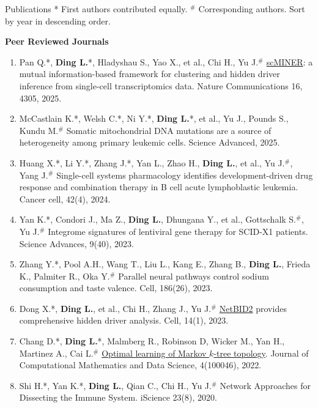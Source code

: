 \documentclass{resume} %
\begin{document}
\begin{rSection}{Publications}
* First authors contributed equally.  $^{\#}$ Corresponding authors. Sort by year in descending order.

\textbf{Peer Reviewed Journals}
\begin{enumerate}
\item Pan Q.*, \textbf{Ding L.}*, Hladyshau S., Yao X., et al., Chi H., Yu J.$^{\#}$ \href{https://github.com/jyyulab/scMINER}{scMINER}: a mutual information-based framework for clustering and hidden driver inference from single-cell transcriptomics data. Nature Communications 16, 4305, 2025.

\item McCastlain K.*, Welsh C.*, Ni Y.*, \textbf{Ding L.}*, et al., Yu J., Pounds S., Kundu M.$^{\#}$ Somatic mitochondrial DNA mutations are a source of heterogeneity among primary leukemic cells. Science Advanced, 2025.

\item Huang X.*, Li Y.*, Zhang J.*, Yan L., Zhao H., \textbf{Ding L.}, et al., Yu J.$^{\#}$, Yang J.$^{\#}$ Single-cell systems pharmacology identifies development-driven drug response and combination therapy in B cell acute lymphoblastic leukemia. Cancer cell, 42(4), 2024.

\item Yan K.*, Condori J., Ma Z., \textbf{Ding L.}, Dhungana Y., et al., Gottschalk S.$^{\#}$, Yu J.$^{\#}$ Integrome signatures of lentiviral gene therapy for SCID-X1 patients. Science Advances, 9(40), 2023.

\item Zhang Y.*, Pool A.H., Wang T., Liu L., Kang E., Zhang B., \textbf{Ding L.}, Frieda K., Palmiter R., Oka Y.$^{\#}$ Parallel neural pathways control sodium consumption and taste valence. Cell, 186(26), 2023.

\item Dong X.*, \textbf{Ding L.}, et al., Chi H., Zhang J., Yu J.$^{\#}$ \href{https://github.com/jyyulab/NetBID}{NetBID2} provides comprehensive hidden driver analysis. Cell, 14(1), 2023.

\item Chang D.*, \textbf{Ding L.}*, Malmberg R., Robinson D, Wicker M., Yan H., Martinez A., Cai L.$^{\#}$ \href{https://www.sciencedirect.com/science/article/pii/S277241582200013X}{Optimal learning of Markov $k$-tree topology}. Journal of Computational Mathematics and Data Science, 4(100046), 2022.

\item Shi H.*, Yan K.*, \textbf{Ding L.}, Qian C., Chi H., Yu J.$^{\#}$ Network Approaches for Dissecting the Immune System. iScience 23(8), 2020.


\end{enumerate}
\end{rSection}
\end{document}
